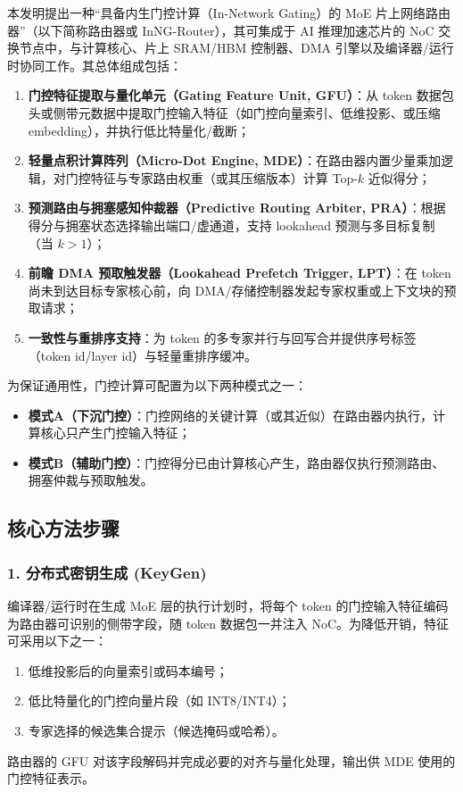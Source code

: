 \documentclass[12pt,a4paper]{article}
\begin{document}
本发明提出一种“具备内生门控计算（In-Network Gating）的 MoE 片上网络路由器”（以下简称路由器或 InNG-Router），其可集成于 AI 推理加速芯片的 NoC 交换节点中，与计算核心、片上 SRAM/HBM 控制器、DMA 引擎以及编译器/运行时协同工作。其总体组成包括：
\begin{enumerate}
    \item \textbf{门控特征提取与量化单元（Gating Feature Unit, GFU）}：从 token 数据包头或侧带元数据中提取门控输入特征（如门控向量索引、低维投影、或压缩 embedding），并执行低比特量化/截断；
    \item \textbf{轻量点积计算阵列（Micro-Dot Engine, MDE）}：在路由器内置少量乘加逻辑，对门控特征与专家路由权重（或其压缩版本）计算 Top-$k$ 近似得分；
    \item \textbf{预测路由与拥塞感知仲裁器（Predictive Routing Arbiter, PRA）}：根据得分与拥塞状态选择输出端口/虚通道，支持 lookahead 预测与多目标复制（当 $k>1$）；
    \item \textbf{前瞻 DMA 预取触发器（Lookahead Prefetch Trigger, LPT）}：在 token 尚未到达目标专家核心前，向 DMA/存储控制器发起专家权重或上下文块的预取请求；
    \item \textbf{一致性与重排序支持}：为 token 的多专家并行与回写合并提供序号标签（token id/layer id）与轻量重排序缓冲。
\end{enumerate}

为保证通用性，门控计算可配置为以下两种模式之一：
\begin{itemize}
    \item \textbf{模式A（下沉门控）}：门控网络的关键计算（或其近似）在路由器内执行，计算核心只产生门控输入特征；
    \item \textbf{模式B（辅助门控）}：门控得分已由计算核心产生，路由器仅执行预测路由、拥塞仲裁与预取触发。
\end{itemize}

\subsection{核心方法步骤}

\subsubsection{1. 分布式密钥生成 (KeyGen)}

编译器/运行时在生成 MoE 层的执行计划时，将每个 token 的门控输入特征编码为路由器可识别的侧带字段，随 token 数据包一并注入 NoC。为降低开销，特征可采用以下之一：
\begin{enumerate}
    \item 低维投影后的向量索引或码本编号；
    \item 低比特量化的门控向量片段（如 INT8/INT4）；
    \item 专家选择的候选集合提示（候选掩码或哈希）。
\end{enumerate}
路由器的 GFU 对该字段解码并完成必要的对齐与量化处理，输出供 MDE 使用的门控特征表示。
\end{document}

